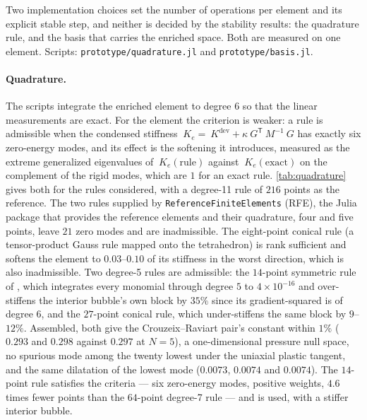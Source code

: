 \documentclass{article}
\newcommand{\transpose}[1]{#1^{\mathsf{T}}}
\newcommand{\supdev}{^{\mathrm{dev}}}
\newcommand{\code}[1]{\texttt{#1}}
\theoremstyle{definition}
\theoremstyle{plain}
\begin{document}
Two implementation choices set the number of operations per element and its
explicit stable step, and neither is decided by the stability results: the
quadrature rule, and the basis that carries the enriched space. Both are
measured on one element. Scripts:
\code{prototype/quadrature.jl} and \code{prototype/basis.jl}.

\paragraph{Quadrature.} The scripts integrate the enriched element to degree
$6$ so that the linear measurements are exact. For the element the criterion
is weaker: a rule is admissible when the condensed stiffness
$~K_e = ~K\supdev + \kappa\transpose{~G}~M^{-1}~G$ has exactly six
zero-energy modes, and its effect is the softening it introduces, measured as
the extreme generalized eigenvalues of $~K_e(\text{rule})$ against
$~K_e(\text{exact})$ on the complement of the rigid modes, which are $1$ for
an exact rule. \cref{tab:quadrature} gives both for the rules
considered, with a degree-11 rule of $216$ points as the reference. The two
rules supplied by \code{ReferenceFiniteElements} (RFE), the Julia package that
provides the reference elements and their quadrature, four and five points,
leave
$21$ zero modes and are inadmissible. The eight-point conical rule (a
tensor-product Gauss rule mapped onto the tetrahedron) is rank sufficient and softens the element to $0.03$--$0.10$ of its stiffness in
the worst direction, which is also inadmissible. Two degree-5 rules are
admissible: the $14$-point symmetric rule of \textcite{Walkington:2000}, which
integrates every monomial through degree $5$ to $4\times10^{-16}$ and
over-stiffens the interior bubble's own block by $35\%$ since its
gradient-squared is of degree $6$, and the $27$-point conical rule, which
under-stiffens the same block by $9$--$12\%$. Assembled, both give the
Crouzeix--Raviart pair's constant within $1\%$ ($0.293$ and $0.298$ against
$0.297$ at $N = 5$), a one-dimensional pressure null space, no spurious mode
among the twenty lowest under the uniaxial plastic tangent, and the same
dilatation of the lowest mode ($0.0073$, $0.0074$ and $0.0074$). The
$14$-point rule satisfies the criteria --- six zero-energy modes, positive
weights, $4.6$ times fewer points than the $64$-point degree-7 rule --- and
is used, with a stiffer interior bubble.
\end{document}
